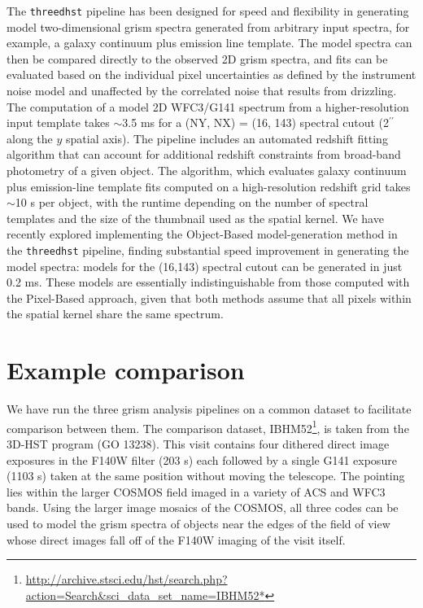 \documentclass[preprint]{aastex}
\begin{document}
The \texttt{threedhst} pipeline has been designed for speed and flexibility in generating model two-dimensional grism spectra generated from arbitrary input spectra, for example, a galaxy continuum plus emission line template.  The model spectra can then be compared directly to the observed 2D grism spectra, and fits can be evaluated based on the individual pixel uncertainties as defined by the instrument noise model and unaffected by the correlated noise that results from drizzling.  The computation of a model 2D WFC3/G141 spectrum from a higher-resolution input template takes $\sim$3.5 ms for a (NY, NX) = (16, 143) spectral cutout (2$^{\prime\prime}$ along the $y$ spatial axis).  The pipeline includes an automated redshift fitting algorithm that can account for additional redshift constraints from broad-band photometry of a given object.  The algorithm, which evaluates galaxy continuum plus emission-line template fits computed on a high-resolution redshift grid takes $\sim$10 s per object, with the runtime depending on the number of spectral templates and the size of the thumbnail used as the spatial kernel.  We have recently explored implementing the Object-Based model-generation method in the \texttt{threedhst} pipeline, finding substantial speed improvement in generating the model spectra:  models for the (16,143) spectral cutout can be generated in just 0.2 ms.  These models are essentially indistinguishable from those computed with the Pixel-Based approach, given that both methods assume that all pixels within the spatial kernel share the same spectrum.  

\section{Example comparison}

We have run the three grism analysis pipelines on a common dataset to facilitate comparison between them.  The comparison dataset, IBHM52\footnote{\url{http://archive.stsci.edu/hst/search.php?action=Search&sci_data_set_name=IBHM52*}}, is taken from the 3D-HST program (GO 13238).  This visit contains four dithered direct image exposures in the F140W filter (203 s) each followed by a single G141 exposure (1103 s) taken at the same position without moving the telescope.  The pointing lies within the larger COSMOS field imaged in a variety of ACS and WFC3 bands.  Using the larger image mosaics of the COSMOS, all three codes can be used to model the grism spectra of objects near the edges of the field of view whose direct images fall off of the F140W imaging of the visit itself.
    
\end{document}

